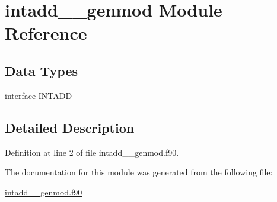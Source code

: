\hypertarget{classintadd____genmod}{\section{intadd\+\_\+\+\_\+genmod Module Reference}
\label{classintadd____genmod}
}
\subsection*{Data Types}
\begin{DoxyCompactItemize}
\item 
interface \hyperlink{interfaceintadd____genmod_1_1INTADD}{I\+N\+T\+A\+D\+D}
\end{DoxyCompactItemize}


\subsection{Detailed Description}


Definition at line 2 of file intadd\+\_\+\+\_\+genmod.\+f90.



The documentation for this module was generated from the following file\+:\begin{DoxyCompactItemize}
\item 
\hyperlink{intadd____genmod_8f90}{intadd\+\_\+\+\_\+genmod.\+f90}\end{DoxyCompactItemize}
